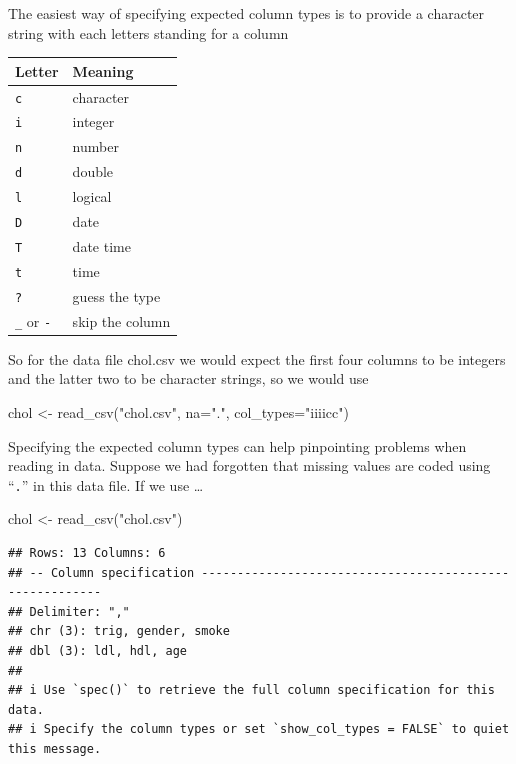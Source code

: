\documentclass[
]{book}
\newenvironment{Shaded}{\begin{snugshade}}{\end{snugshade}}
\newcommand{\AttributeTok}[1]{\textcolor[rgb]{0.77,0.63,0.00}{#1}}
\newcommand{\FunctionTok}[1]{\textcolor[rgb]{0.00,0.00,0.00}{#1}}
\newcommand{\NormalTok}[1]{#1}
\newcommand{\OtherTok}[1]{\textcolor[rgb]{0.56,0.35,0.01}{#1}}
\newcommand{\StringTok}[1]{\textcolor[rgb]{0.31,0.60,0.02}{#1}}
\begin{document}
The easiest way of specifying expected column types is to provide a character string with each letters standing for a column

\begin{longtable}[]{@{}ll@{}}
\toprule()
Letter & Meaning \\
\midrule()
\endhead
\texttt{c} & character \\
\texttt{i} & integer \\
\texttt{n} & number \\
\texttt{d} & double \\
\texttt{l} & logical \\
\texttt{D} & date \\
\texttt{T} & date time \\
\texttt{t} & time \\
\texttt{?} & guess the type \\
\texttt{\_} or \texttt{-} & skip the column \\
\bottomrule()
\end{longtable}

So for the data file chol.csv we would expect the first four columns to be integers and the latter two to be character strings, so we would use

\begin{Shaded}
\begin{Highlighting}[]
\NormalTok{chol }\OtherTok{\textless{}{-}} \FunctionTok{read\_csv}\NormalTok{(}\StringTok{"chol.csv"}\NormalTok{, }\AttributeTok{na=}\StringTok{"."}\NormalTok{, }\AttributeTok{col\_types=}\StringTok{"iiiicc"}\NormalTok{)}
\end{Highlighting}
\end{Shaded}

Specifying the expected column types can help pinpointing problems when reading in data. Suppose we had forgotten that missing values are coded using ``\texttt{.}'' in this data file. If we use \ldots{}

\begin{Shaded}
\begin{Highlighting}[]
\NormalTok{chol }\OtherTok{\textless{}{-}} \FunctionTok{read\_csv}\NormalTok{(}\StringTok{"chol.csv"}\NormalTok{)}
\end{Highlighting}
\end{Shaded}

\begin{verbatim}
## Rows: 13 Columns: 6
## -- Column specification --------------------------------------------------------
## Delimiter: ","
## chr (3): trig, gender, smoke
## dbl (3): ldl, hdl, age
## 
## i Use `spec()` to retrieve the full column specification for this data.
## i Specify the column types or set `show_col_types = FALSE` to quiet this message.
\end{verbatim}
\end{document}
